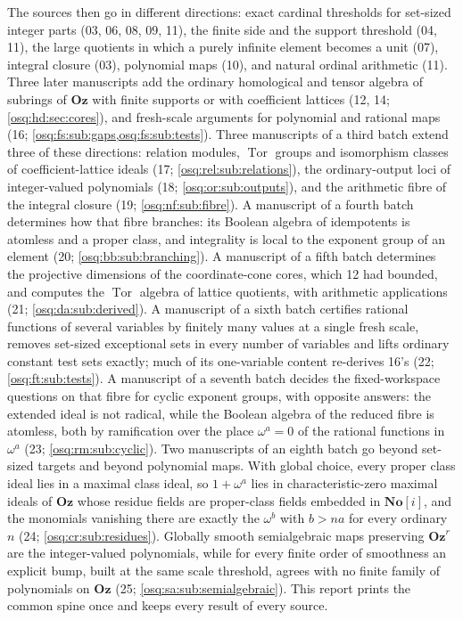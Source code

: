 \documentclass[11pt,letterpaper]{article}
\numberwithin{equation}{section}
\theoremstyle{definition}
\theoremstyle{remark}
\theoremstyle{plain}
\newcommand{\No}{\mathbf{No}}
\newcommand{\Oz}{\mathbf{Oz}}
\newcommand{\SC}{\No[i]}
\newcommand{\Tor}{\operatorname{Tor}}
\begin{document}
The sources then go in different directions: exact cardinal thresholds for set-sized
integer parts (03, 06, 08, 09, 11), the finite side and the support threshold (04, 11), the
large quotients in which a purely infinite element becomes a unit (07), integral closure
(03), polynomial maps (10), and natural ordinal arithmetic (11). Three later manuscripts add
the ordinary homological and tensor algebra of subrings of $\Oz$ with finite supports or with
coefficient lattices (12, 14; \cref{osq:hd:sec:cores}), and fresh-scale arguments for polynomial and
rational maps (16; \cref{osq:fs:sub:gaps,osq:fs:sub:tests}). Three manuscripts of a third batch extend
three of these directions: relation modules, $\Tor$ groups and isomorphism classes of coefficient-lattice
ideals (17; \cref{osq:rel:sub:relations}), the ordinary-output loci of integer-valued polynomials (18;
\cref{osq:or:sub:outputs}), and the arithmetic fibre of the integral closure (19; \cref{osq:nf:sub:fibre}). A manuscript
of a fourth batch determines how that fibre branches: its Boolean algebra of idempotents is atomless and a proper class,
and integrality is local to the exponent group of an element (20; \cref{osq:bb:sub:branching}).
A manuscript of a fifth batch determines the projective dimensions of the coordinate-cone cores, which 12 had bounded, and
computes the $\Tor$ algebra of lattice quotients, with arithmetic applications (21; \cref{osq:da:sub:derived}).
A manuscript of a sixth batch certifies rational functions of several variables by finitely many values at a single fresh scale,
removes set-sized exceptional sets in every number of variables and lifts ordinary constant test sets exactly; much of its
one-variable content re-derives 16's (22; \cref{osq:ft:sub:tests}).
A manuscript of a seventh batch decides the fixed-workspace questions on that fibre for cyclic exponent groups, with opposite
answers: the extended ideal is not radical, while the Boolean algebra of the reduced fibre is atomless, both by ramification over
the place $\omega^a=0$ of the rational functions in $\omega^a$ (23; \cref{osq:rm:sub:cyclic}).
Two manuscripts of an eighth batch go beyond set-sized targets and beyond polynomial maps. With global choice, every proper class ideal lies
in a maximal class ideal, so $1+\omega^a$ lies in characteristic-zero maximal ideals of $\Oz$ whose residue fields are proper-class fields embedded
in $\SC$, and the monomials vanishing there are exactly the $\omega^b$ with $b>na$ for every ordinary $n$ (24; \cref{osq:cr:sub:residues}).
Globally smooth semialgebraic maps preserving $\Oz^r$ are the integer-valued polynomials, while for every finite order of smoothness an
explicit bump, built at the same scale threshold, agrees with no finite family of polynomials on $\Oz$ (25; \cref{osq:sa:sub:semialgebraic}).
This report prints the common spine once and keeps every result of every source.
\end{document}
